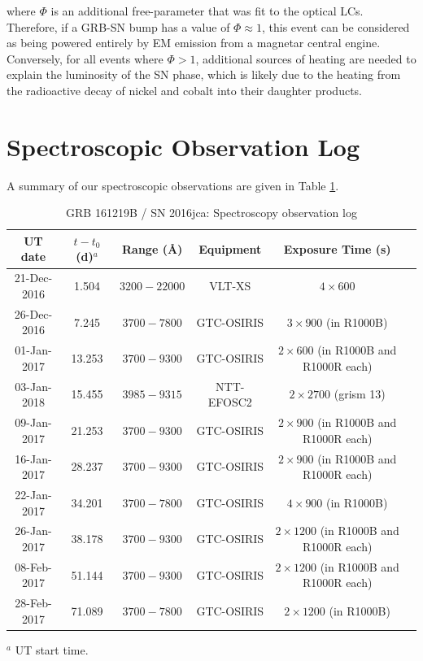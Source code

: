 \documentclass[traditabstract,longauth]{aa}
\begin{document}
\begin{appendix}
\noindent where $\Phi$ is an additional free-parameter that was fit to the optical LCs.  Therefore, if a GRB-SN bump  has a value of $\Phi \approx 1$, this event can be considered as being powered entirely by EM emission from a magnetar central engine.  Conversely, for all events where $\Phi > 1$, additional sources of heating are needed to explain the luminosity of the SN phase, which is likely due to the heating from the radioactive decay of nickel and cobalt into their daughter products.



\section{Spectroscopic Observation Log}

A summary of our spectroscopic observations are given in Table \ref{table:spectra_obs_log}.

\begin{table}
\centering
\setlength{\tabcolsep}{6.0pt}
\setlength{\extrarowheight}{3pt}
\caption{GRB 161219B / SN 2016jca: Spectroscopy observation log}
\label{table:spectra_obs_log}
\begin{tabular}{cccccc}
\hline													
UT date	&		$t-t_{0}$ (d)$^{a}$	&	Range (\AA)	&	Equipment	&	Exposure Time (s)	\\
\hline													
21-Dec-2016 &  1.504 &  $3200-22000$ & VLT-XS & $4 \times 600$ \\
26-Dec-2016 &  7.245 &  $3700-7800$ & GTC-OSIRIS & $3 \times 900$ (in R1000B) \\
01-Jan-2017 &  13.253 &  $3700-9300$ & GTC-OSIRIS & $2 \times 600$ (in R1000B and R1000R each) \\
03-Jan-2018 &  15.455 &  $3985-9315$ & NTT-EFOSC2 & $2 \times 2700$ (grism 13) \\
09-Jan-2017 &  21.253 &  $3700-9300$ & GTC-OSIRIS & $2 \times 900$ (in R1000B and R1000R each) \\
16-Jan-2017 &  28.237 &  $3700-9300$ & GTC-OSIRIS & $2 \times 900$ (in R1000B and R1000R each) \\
22-Jan-2017 &  34.201 &  $3700-7800$ & GTC-OSIRIS & $4 \times 900$ (in R1000B) \\
26-Jan-2017 &  38.178 &  $3700-9300$ & GTC-OSIRIS & $2 \times 1200$ (in R1000B and R1000R each) \\
08-Feb-2017 &  51.144 &  $3700-9300$ & GTC-OSIRIS & $2 \times 1200$ (in R1000B and R1000R each) \\
28-Feb-2017 &  71.089 &  $3700-7800$ & GTC-OSIRIS & $2 \times 1200$ (in R1000B) \\
\hline	
\end{tabular}
\begin{flushleft}
$^{a}$ UT start time. \\
\end{flushleft}
\end{table}



\end{appendix}
\end{document}
